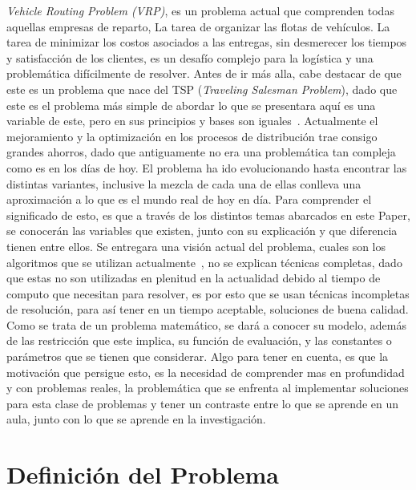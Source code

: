\documentclass[letter, 10pt]{article}
\begin{document}
\emph{Vehicle Routing Problem (VRP)}, es un problema actual que comprenden todas aquellas empresas de reparto, La tarea de organizar las flotas
de veh\'iculos. La tarea de minimizar los costos asociados a las entregas, sin desmerecer los tiempos y satisfacci\'on de los clientes, es un desaf\'io
complejo para la log\'istica y una problem\'atica dif\'icilmente de resolver.
\newline
Antes de ir m\'as alla, cabe destacar de que este es un problema que nace del TSP (\emph{Traveling Salesman Problem}), dado que este es el problema
m\'as simple de abordar lo que se presentara aqu\'i es una variable de este, pero en sus principios y bases son iguales~\cite{TSP}.
\newline
Actualmente el mejoramiento y la optimizaci\'on en los procesos de distribuci\'on trae consigo grandes ahorros, dado que antiguamente no era una
problem\'atica tan compleja como es en los d\'ias de hoy. El problema ha ido evolucionando hasta encontrar las distintas variantes, inclusive la 
mezcla de cada una de ellas conlleva una aproximaci\'on a lo que es el mundo real de hoy en d\'ia. Para comprender el significado de esto,
es que a trav\'es de los distintos temas abarcados en este Paper, se conocer\'an las variables que existen, junto con su explicaci\'on y que diferencia
tienen entre ellos. Se entregara una visi\'on actual del problema, cuales son los algoritmos que se utilizan actualmente~\cite{Prosser93Hybrid}, no se explican t\'ecnicas 
completas, dado que estas no son utilizadas en plenitud en la actualidad debido al tiempo de computo que necesitan para resolver, es por esto que se usan 
t\'ecnicas incompletas de resoluci\'on, para as\'i tener en un tiempo aceptable, soluciones de buena calidad.
Como se trata de un problema matem\'atico, se dar\'a a conocer su modelo, adem\'as de las restricci\'on que este implica, su funci\'on de evaluaci\'on,
y las constantes o par\'ametros que se tienen que considerar.
\newline
Algo para tener en cuenta, es que la motivaci\'on que persigue esto, es la necesidad de comprender mas en profundidad y con problemas reales, la 
problem\'atica que se enfrenta al implementar soluciones para esta clase de problemas y tener un contraste entre lo que se aprende en un aula, junto
con lo que se aprende en la investigaci\'on.

\newpage
\section{Definici\'on del Problema}
\end{document}
